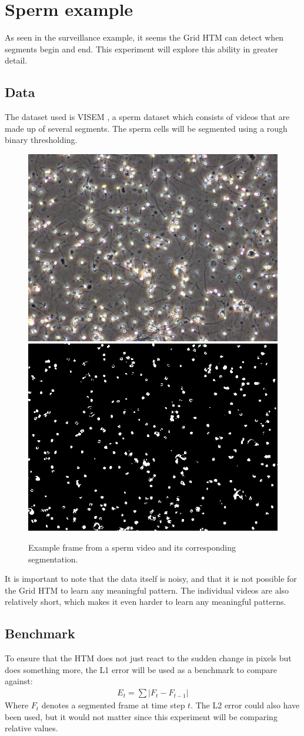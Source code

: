 \section{Sperm example}
As seen in the surveillance example, it seems the Grid HTM can detect when segments begin and end. This experiment will explore this ability in greater detail.
\subsection{Data}
The dataset used is VISEM \cite{VISEM}, a sperm dataset which consists of videos that are made up of several segments. The sperm cells will be segmented using a rough binary thresholding.
\begin{figure}[H]
    \centering
    \includegraphics[width=.45\textwidth]{resources/experiments/sperm/sperm_example.png}
    \includegraphics[width=.45\textwidth]{resources/experiments/sperm/sperm_seg_example.png}
    \caption{Example frame from a sperm video and its corresponding segmentation.}
\end{figure}
It is important to note that the data itself is noisy, and that it is not possible for the Grid HTM to learn any meaningful pattern. The individual videos are also relatively short, which makes it even harder to learn any meaningful patterns.
\subsection{Benchmark}
To ensure that the HTM does not just react to the sudden change in pixels but does something more, the L1 error will be used as a benchmark to compare against:
\begin{align*}
    E_t=\sum|F_t-F_{t-1}|
\end{align*}
Where $F_t$ denotes a segmented frame at time step $t$. The L2 error could also have been used, but it would not matter since this experiment will be comparing relative values.
